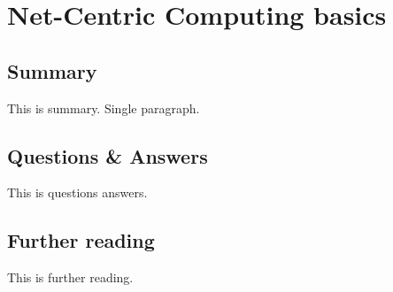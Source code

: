 \section{Net-Centric Computing basics}

\subsection{Summary}
This is summary. Single paragraph.

\subsection{Questions \& Answers}
This is questions answers.

\subsection{Further reading}
This is further reading.
